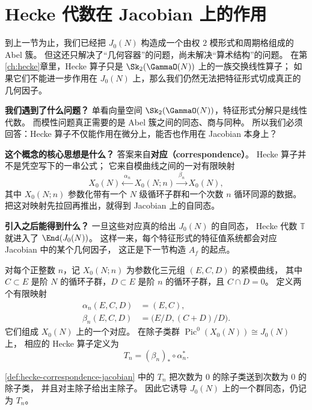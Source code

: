 \section{Hecke 代数在 Jacobian 上的作用}
\label{sec:hecke-on-jacobian}

到上一节为止，我们已经把 $J_0(N)$ 构造成一个由权 $2$ 模形式和周期格组成的 Abel 簇。
但这还只解决了“几何容器”的问题，尚未解决“算术结构”的问题。
在第\ref{ch:hecke}章里，Hecke 算子只是 $\Sk_2(\GammaO(N))$ 上的一族交换线性算子；
如果它们不能进一步作用在 $J_0(N)$ 上，那么我们仍然无法把特征形式切成真正的几何因子。

\textbf{我们遇到了什么问题？}
单看向量空间 $\Sk_2(\GammaO(N))$，特征形式分解只是线性代数。
而模性问题真正需要的是 Abel 簇之间的同态、商与同种。
所以我们必须回答：Hecke 算子不仅能作用在微分上，能否也作用在 Jacobian 本身上？

\textbf{这个概念的核心思想是什么？}
答案来自\textbf{对应（correspondence）}。
Hecke 算子并不是凭空写下的一串公式；
它来自模曲线之间的一对有限映射
\[
  X_0(N) \xleftarrow{\ \alpha_n\ } X_0(N;n) \xrightarrow{\ \beta_n\ } X_0(N),
\]
其中 $X_0(N;n)$ 参数化带有一个 $N$ 级循环子群和一个次数 $n$ 循环同源的数据。
把这对映射先拉回再推出，就得到 Jacobian 上的自同态。

\textbf{引入之后能得到什么？}
一旦这些对应真的给出 $J_0(N)$ 的自同态，
Hecke 代数 $\mathbb T$ 就进入了 $\End(J_0(N))$。
这样一来，每个特征形式的特征值系统都会对应 Jacobian 中的某个几何因子，
这正是下一节构造 $A_f$ 的起点。



\begin{definition}[Hecke 对应]
\label{def:hecke-correspondence-jacobian}
对每个正整数 $n$，记 $X_0(N;n)$ 为参数化三元组 $(E,C,D)$ 的紧模曲线，
其中 $C\subset E$ 是阶 $N$ 的循环子群，$D\subset E$ 是阶 $n$ 的循环子群，且 $C\cap D=0$。
定义两个有限映射
\begin{align*}
  \alpha_n(E,C,D)&=(E,C),\\
  \beta_n(E,C,D)&=\bigl(E/D,(C+D)/D\bigr).
\end{align*}
它们组成 $X_0(N)$ 上的一个对应。
在除子类群 $\operatorname{Pic}^0(X_0(N))\cong J_0(N)$ 上，
相应的 Hecke 算子定义为
\[
  T_n=(\beta_n)_*\circ \alpha_n^*.
\]
\end{definition}

\begin{proposition}
\label{prop:hecke-correspondence-on-jacobian}
\cref{def:hecke-correspondence-jacobian} 中的 $T_n$ 把次数为 $0$ 的除子类送到次数为 $0$ 的除子类，
并且对主除子给出主除子。
因此它诱导 $J_0(N)$ 上的一个群同态，仍记为 $T_n$。
\end{proposition}

